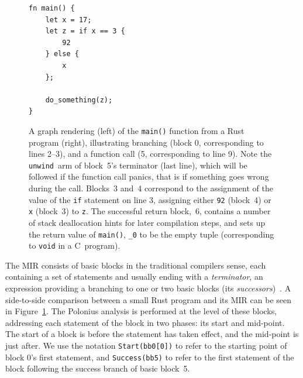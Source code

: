 \documentclass[11pt,a4paper,twoside,openany]{report}
\newenvironment{sourcecode}{\captionsetup{type=listing}}{}
\newcommand{\InRust}[1]{\texttt{#1}}
\begin{document}
\begin{figure}
\begin{minipage}{.5\textwidth}
\end{minipage}%
\begin{minipage}{.5\textwidth}
  \begin{sourcecode}
  \label{lst:mir-example-input}
\begin{verbatim}
fn main() {
    let x = 17;
    let z = if x == 3 {
        92
    } else {
        x
    };

    do_something(z);
}
\end{verbatim}
\end{sourcecode}
\end{minipage}
\caption[MIR of a Small Rust Program With Function Call]{A graph rendering
  (left) of the \InRust{main()} function from a Rust program (right),
  illustrating branching (block 0, corresponding to lines 2--3), and a function
  call (5, corresponding to line 9). Note the \texttt{unwind}~arm of block~5's
  terminator (last line), which will be followed if the function call panics,
  that is if something goes wrong during the call. Blocks~3 and~4 correspond to
  the assignment of the value of the \InRust{if} statement on line 3, assigning
  either \InRust{92} (block~4) or \InRust{x} (block~3) to \InRust{z}. The
  successful return block,~6, contains a number of stack deallocation hints for
  later compilation steps, and sets up the return value of \InRust{main()},
  \InRust{_0} to be the empty tuple (corresponding to \texttt{void} in a
  C~program).}\label{fig:mir-example}
\end{figure}

The MIR consists of basic blocks in the traditional compilers sense, each
containing a set of statements and usually ending with a \emph{terminator}, an
expression providing a branching to one or two basic blocks (its
\emph{successors})~\cite{mir_rfc}. A side-to-side comparison between a small
Rust program and its MIR can be seen in Figure~\ref{fig:mir-example}. The
Polonius analysis is performed at the level of these blocks, addressing each
statement of the block in two phases: its start and mid-point. The start of a
block is before the statement has taken effect, and the mid-point is just after.
We use the notation \InRust{Start(bb0[0])} to refer to the starting point of
block 0's first statement, and \InRust{Success(bb5)} to refer to the first
statement of the block following the success branch of basic block~5.
\end{document}
